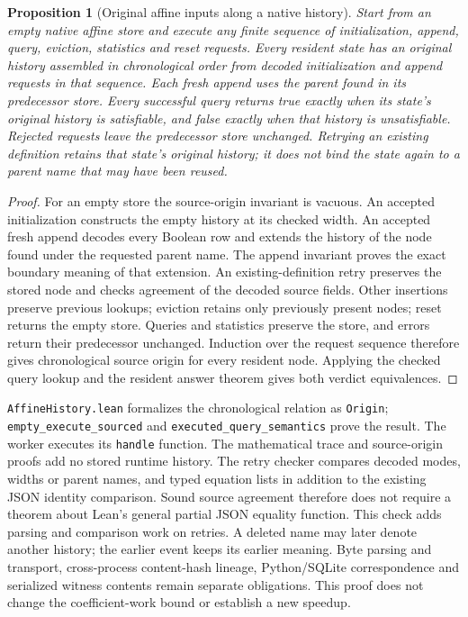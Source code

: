 \documentclass[11pt,a4paper]{article}
\numberwithin{equation}{section}
\theoremstyle{plain}
\newtheorem{proposition}[lemma]{Proposition}
\theoremstyle{definition}
\theoremstyle{remark}
\begin{document}
\begin{proposition}[Original affine inputs along a native history]
\label{prop:affine-history}
Start from an empty native affine store and execute any finite sequence of initialization, append, query, eviction, statistics and reset requests. Every resident state has an original history assembled in chronological order from decoded initialization and append requests in that sequence. Each fresh append uses the parent found in its predecessor store. Every successful query returns true exactly when its state's original history is satisfiable, and false exactly when that history is unsatisfiable. Rejected requests leave the predecessor store unchanged. Retrying an existing definition retains that state's original history; it does not bind the state again to a parent name that may have been reused.
\end{proposition}
\begin{proof}
For an empty store the source-origin invariant is vacuous. An accepted initialization constructs the empty history at its checked width. An accepted fresh append decodes every Boolean row and extends the history of the node found under the requested parent name. The append invariant proves the exact boundary meaning of that extension. An existing-definition retry preserves the stored node and checks agreement of the decoded source fields. Other insertions preserve previous lookups; eviction retains only previously present nodes; reset returns the empty store. Queries and statistics preserve the store, and errors return their predecessor unchanged. Induction over the request sequence therefore gives chronological source origin for every resident node. Applying the checked query lookup and the resident answer theorem gives both verdict equivalences.
\end{proof}

\texttt{AffineHistory.lean} formalizes the chronological relation as \texttt{Origin}; \texttt{empty\_execute\_sourced} and \texttt{executed\_query\_semantics} prove the result. The worker executes its \texttt{handle} function. The mathematical trace and source-origin proofs add no stored runtime history. The retry checker compares decoded modes, widths or parent names, and typed equation lists in addition to the existing JSON identity comparison. Sound source agreement therefore does not require a theorem about Lean's general partial JSON equality function. This check adds parsing and comparison work on retries. A deleted name may later denote another history; the earlier event keeps its earlier meaning. Byte parsing and transport, cross-process content-hash lineage, Python/SQLite correspondence and serialized witness contents remain separate obligations. This proof does not change the coefficient-work bound or establish a new speedup.
\end{document}

